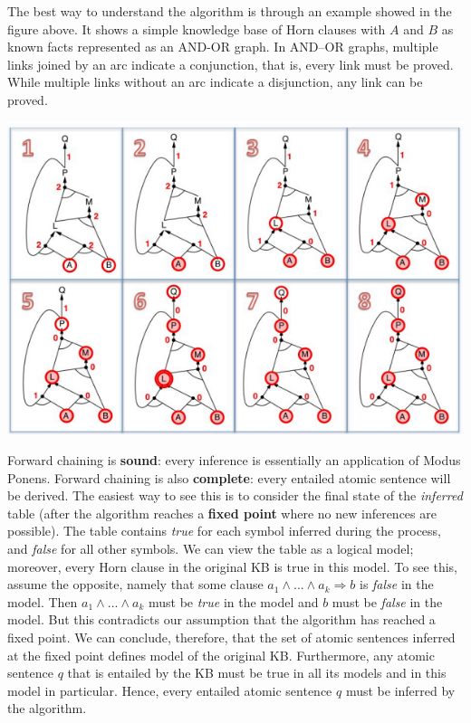 The best way to understand the algorithm is through an example showed in the figure above. It shows a simple knowledge base of Horn clauses with $A$ and $B$ as known facts represented as an AND-OR graph. In AND–OR graphs, multiple links joined by an arc indicate a conjunction, that is, every link must be proved. While multiple links without an arc indicate a disjunction, any link can be proved.
\begin{center}
    \includegraphics[]{images/frwd exec.png}
\end{center}
Forward chaining is \textbf{sound}: every inference is essentially an application of Modus Ponens. Forward chaining is also \textbf{complete}: every entailed atomic sentence will be derived.\newline\newline
The easiest way to see this is to consider the final state of the \textit{inferred} table (after the algorithm reaches a \textbf{fixed point} where no new inferences are possible). The table contains \textit{true} for each symbol inferred during the process, and \textit{false} for all other symbols. We can view the table as a logical model; moreover, every Horn clause in the original KB is true in this model. To see this, assume the opposite, namely that some clause $a_1\land ...\land a_k \Rightarrow b$ is \textit{false} in the model. Then $a_1\land ...\land a_k$ must be \textit{true} in the model and $b$ must be \textit{false} in the model. But this contradicts our assumption that the algorithm has reached a fixed point. We can conclude, therefore, that the set of atomic sentences inferred at the fixed point defines model of the original KB. Furthermore, any atomic sentence $q$ that is entailed by the KB must be true in all its models and in this model in particular. Hence, every entailed atomic sentence $q$ must be inferred by the algorithm.\newline\newline
